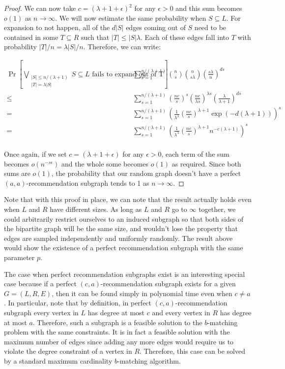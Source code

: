 \documentclass[11pt]{article}
\newcommand{\vs}{\vspace{0.2cm}}
\begin{document}
\begin{proof}
We can now take $c=(\lambda+1+\epsilon)^2$ for any $\epsilon>0$ and this sum becomes $o(1)$ as $n\to\infty$. We will now estimate the same probability when $S\subseteq L$. For expansion to not happen, all of the $d|S|$ edges coming out of $S$ need to be contained in some $T\subseteq R$ such that $|T|\leq |S|\lambda$. Each of these edges fall into $T$ with probability $|T|/n = \lambda|S|/n$. Therefore, we can write:

\begin{align*}
       \Pr\left[\bigvee_{\substack{|S|\leq n/(\lambda+1) \\ |T| = \lambda |S|}} \text{$S\subseteq L$ fails to expand out of T}\right]
\leq&  \sum_{s=1}^{n/(\lambda+1)} \binom{n}{s}\binom{n}{s\lambda}\left(\frac{s\lambda}{n}\right)^{ds}\\
\leq&  \sum_{s=1}^{n/(\lambda+1)} \left(\frac{ne}{s}\right)^s \left(\frac{ne}{\lambda s}\right)^{\lambda s} \left(\frac{\lambda}{\lambda+1}\right)^{ds}\\
=&     \sum_{s=1}^{n/(\lambda+1)} \left(\frac{1}{\lambda^\lambda}\left(\frac{ne}{s}\right)^{\lambda+1}\exp(-d(\lambda+1))\right)^s \\
=&     \sum_{s=1}^{n/(\lambda+1)} \left(\frac{1}{\lambda^\lambda}\left(\frac{ne}{s}\right)^{\lambda+1}n^{-c(\lambda+1)}\right)^s \\
\end{align*}

Once again, if we set $c=(\lambda+1+\epsilon)$ for any $\epsilon > 0$, each term of the sum becomes $o(n^{-s\epsilon})$ and the whole some becomes $o(1)$ as required. Since both sums are $o(1)$, the probability that our random graph doesn't have a perfect $(a,a)$-recommendation subgraph tends to 1 as $n\to\infty$.

\end{proof}

Note that with this proof in place, we can note that the result actually holds even when $L$ and $R$ have different sizes. As long as $L$ and $R$ go to $\infty$ together, we could arbitrarily restrict ourselves to an induced subgraph so that both sides of the bipartite graph will be the same size, and wouldn't lose the property that edges are sampled independently and uniformly randomly. The result above would show the existence of a perfect recommendation subgraph with the same parameter $p$. \vs

The case when perfect recommendation subgraphs exist is an interesting special case because if a perfect $(c,a)$-recommendation subgraph exists for a given $G=(L,R,E)$, then it can be found simply in polynomial time even when $c\ne a$. In particular, note that by definition, in perfect $(c,a)$-recommendation subgraph every vertex in $L$ has degree at most $c$ and every vertex in $R$ has degree at most $a$. Therefore, such a subgraph is a feasible solution to the $b$-matching problem with the same constraints. It is in fact a feasible solution with the maximum number of edges since adding any more edges would require us to violate the degree constraint of a vertex in $R$. Therefore, this case can be solved by a standard maximum cardinality $b$-matching algorithm. \vs
\end{document}

